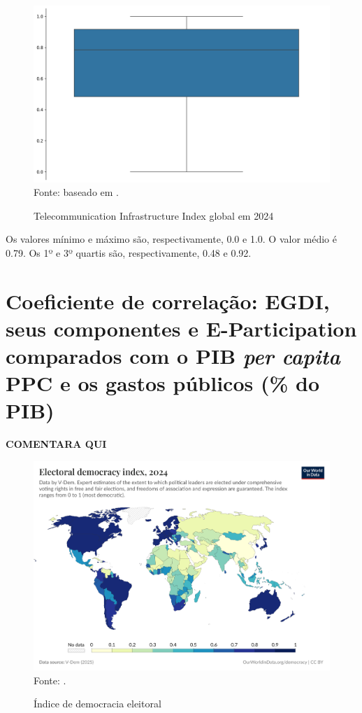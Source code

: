 \begin{figure}[H]
	\centering
	\caption{Telecommunication Infrastructure Index global em 2024}
	\includegraphics[width=1\linewidth]{figuras/egdi/boxplot_tci_global.png}
	\label{fig:boxplot_tci_global}
	\footnotesize{Fonte: baseado em \cite{ONU_EGDI_mapa}.}
\end{figure}

Os valores mínimo e máximo são, respectivamente, 0.0 e 1.0. O  valor médio é 0.79. Os 1º e 3º quartis são, respectivamente, 0.48 e 0.92.

\section{Coeficiente de correlação: EGDI, seus componentes e E-Participation comparados com o PIB \textit{per capita} PPC e os gastos públicos (\% do PIB)}

\textbf{COMENTARA QUI}

\begin{figure}[H]
	\centering
	\caption{Índice de democracia eleitoral}
	\includegraphics[width=1\linewidth]{figuras/democracia/electoral-democracy-index}
	\label{fig:electoral-democracy-index}
	\footnotesize{Fonte: \cite{electoral-democracy-index}.}
\end{figure}

